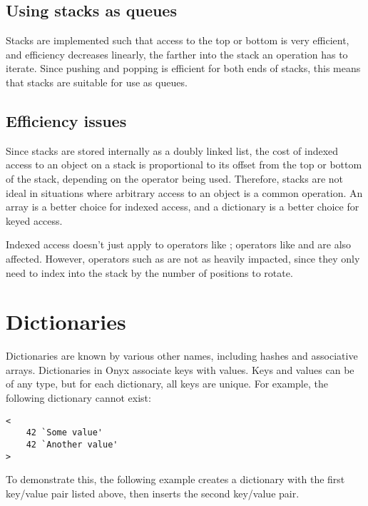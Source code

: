 \subsection{Using stacks as queues}

Stacks are implemented such that access to the top or bottom is very efficient,
and efficiency decreases linearly, the farther into the stack an operation has
to iterate.  Since pushing and popping is efficient for both ends of stacks,
this means that stacks are suitable for use as queues.

\subsection{Efficiency issues}

Since stacks are stored internally as a doubly linked list, the cost of indexed
access to an object on a stack is proportional to its offset from the top or
bottom of the stack, depending on the operator being used.  Therefore, stacks
are not ideal in situations where arbitrary access to an object is a common
operation.  An array is a better choice for indexed access, and a dictionary is
a better choice for keyed access.

Indexed access doesn't just apply to operators like
; operators like
 and
 are also affected.  However,
operators such as  are not as heavily
impacted, since they only need to index into the stack by the number of
positions to rotate.

\section{Dictionaries}

Dictionaries are known by various other names, including hashes and associative
arrays.  Dictionaries in Onyx associate keys with values.  Keys and values can
be of any type, but for each dictionary, all keys are unique.  For example, the
following dictionary cannot exist:

\begin{verbatim}
<
    42 `Some value'
    42 `Another value'
>
\end{verbatim}

To demonstrate this, the following example creates a dictionary with the first
key/value pair listed above, then inserts the second key/value pair.

